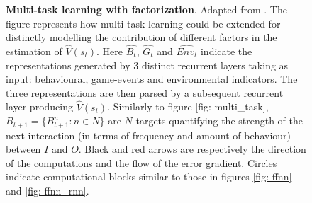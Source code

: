 \begin{figure}
\begin{center}
\begin{adjustbox}{width=0.4\textwidth}
        \end{adjustbox}
    \end{center}
\caption{\textbf{Multi-task learning with factorization}. Adapted from \cite{bengio2017deep}. The figure represents how multi-task learning could be extended for distinctly modelling the contribution of different factors in the estimation of $\widehat{V}(s_t)$. Here $\widehat{B_t}$, $\widehat{G_t}$ and $\widehat{Env_t}$ indicate the representations generated by 3 distinct recurrent layers taking as input: behavioural, game-events and environmental indicators. The three representations are then parsed by a subsequent recurrent layer producing $\widehat{V}(s_t)$. Similarly to figure \ref{fig: multi_task}, $B_{t+1}=\{B^n_{t+1}: n \in N\}$ are $N$ targets quantifying the strength of the next interaction (in terms of frequency and amount of behaviour)  between $I$ and $O$. Black and red arrows are respectively the direction of the computations and the flow of the error gradient. Circles indicate computational blocks similar to those in figures \ref{fig: ffnn} and \ref{fig: ffnn_rnn}.}
\label{fig: fact_multi_task}
\end{figure}